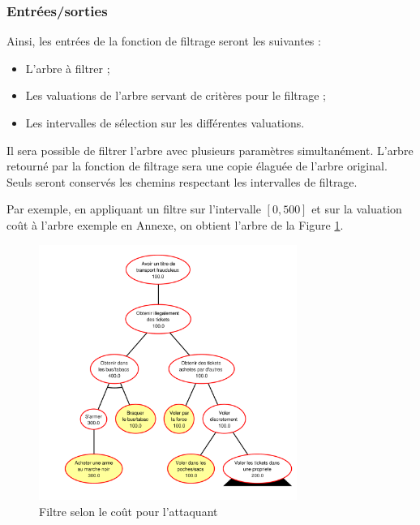 		\subsubsection{Entrées/sorties}	
			Ainsi, les entrées de la fonction de filtrage seront les suivantes : 
			\begin{itemize}
				\item L'arbre à filtrer ;
				\item Les valuations de l'arbre servant de critères pour le filtrage ;
				\item Les intervalles de sélection sur les différentes valuations.\newline
			\end{itemize} %
			
			Il sera possible de filtrer l'arbre avec plusieurs paramètres simultanément.
			L'arbre retourné par la fonction de filtrage sera une copie élaguée de l'arbre original. Seuls seront conservés les chemins respectant les intervalles de filtrage.
		
			Par exemple, en appliquant un filtre sur l'intervalle $[0, 500]$ et sur la valuation \og coût \fg  à l'arbre exemple en Annexe, on obtient l'arbre de la Figure \ref{fig:arbre_post_filtre}.

		\begin{figure}[h!]
			\begin{center}
				\includegraphics[width=0.75\textwidth]{figure/post_filtre.pdf}
			\end{center}
			\caption{Filtre selon le coût pour l'attaquant}
			\label{fig:arbre_post_filtre}
		\end{figure}


